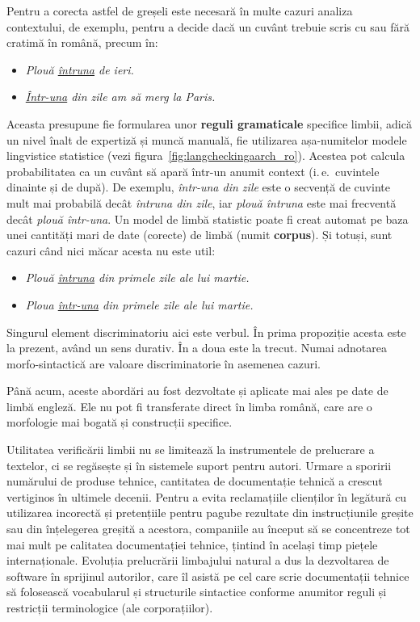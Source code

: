 \begin{multicols}{2}
Pentru a corecta astfel de greșeli este necesară în multe cazuri analiza contextului, de exemplu, pentru a decide dacă un cuvânt trebuie scris cu sau fără cratimă în română, precum în:

\begin{itemize}
\item \textit{Plouă \underline{întruna} de ieri.}
\item \textit{\underline{Într-una} din zile am să merg la Paris.}
\end{itemize}

Aceasta presupune fie formularea unor \textbf{reguli gramaticale} specifice limbii, adică un nivel înalt de expertiză și muncă manuală, fie utilizarea așa-numitelor modele lingvistice statistice (vezi figura~\ref{fig:langcheckingaarch_ro}). Acestea pot calcula probabilitatea ca un cuvânt să apară într-un anumit context (i.\,e.~cuvintele dinainte și de după). De exemplu, \textit{într-una din zile} este o secvență de cuvinte mult mai probabilă decât \textit{întruna din zile}, iar \textit{plouă întruna} este mai frecventă decât \textit{plouă într-una}. Un model de limbă statistic poate fi creat automat pe baza unei cantități mari de date (corecte) de limbă (numit \textbf{corpus}). Și totuși, sunt cazuri când nici măcar acesta nu este util:

\begin{itemize}
\item \textit{Plouă \underline{întruna} din primele zile ale lui martie.}
\item \textit{Ploua \underline{într-una} din primele zile ale lui martie.}
\end{itemize}

Singurul element discriminatoriu aici este verbul. În prima propoziție acesta este la prezent, având un sens durativ. În a doua este la trecut. Numai adnotarea morfo-sintactică are valoare discriminatorie în asemenea cazuri.

Până acum, aceste abordări au fost dezvoltate și aplicate mai ales pe date de limbă engleză. Ele nu pot fi transferate direct în limba română, care are o morfologie mai bogată și construcții specifice.


Utilitatea verificării limbii nu se limitează la instrumentele de prelucrare a textelor, ci se regăsește și în sistemele suport pentru autori. Urmare a sporirii numărului de produse tehnice, cantitatea de documentație tehnică a crescut vertiginos în ultimele decenii. Pentru a evita reclamațiile clienților în legătură cu utilizarea incorectă și pretențiile pentru pagube rezultate din instrucțiunile greșite sau din înțelegerea greșită a acestora, companiile au început să se concentreze tot mai mult pe calitatea documentației tehnice, țintind în același timp piețele internaționale. Evoluția prelucrării limbajului natural a dus la dezvoltarea de software în sprijinul autorilor, care îl asistă pe cel care scrie documentații tehnice să folosească vocabularul și structurile sintactice conforme anumitor reguli și restricții terminologice (ale corporațiilor).


\end{multicols}
